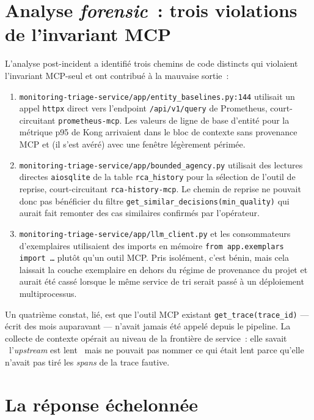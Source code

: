 \documentclass[11pt,a4paper,oneside]{report}
\begin{document}
\section{Analyse \emph{forensic}~: trois violations de l'invariant MCP}

L'analyse post-incident a identifié trois chemins de code distincts
qui violaient l'invariant MCP-seul et ont contribué à la mauvaise
sortie~:

\begin{enumerate}
  \item \texttt{monitoring-triage-service/app/entity\_baselines.py:144}
        utilisait un appel \texttt{httpx} direct vers l'endpoint
        \texttt{/api/v1/query} de Prometheus, court-circuitant
        \texttt{prometheus-mcp}. Les valeurs de ligne de base
        d'entité pour la métrique p95 de Kong arrivaient dans le
        bloc de contexte sans provenance MCP et (il s'est avéré)
        avec une fenêtre légèrement périmée.
  \item \texttt{monitoring-triage-service/app/bounded\_agency.py}
        utilisait des lectures directes \texttt{aiosqlite} de la
        table \texttt{rca\_history} pour la sélection de l'outil
        de reprise, court-circuitant \texttt{rca-history-mcp}. Le
        chemin de reprise ne pouvait donc pas bénéficier du filtre
        \texttt{get\_similar\_decisions(min\_quality)} qui aurait
        fait remonter des cas similaires confirmés par
        l'opérateur.
  \item \texttt{monitoring-triage-service/app/llm\_client.py} et
        les consommateurs d'exemplaires utilisaient des imports en
        mémoire \texttt{from app.exemplars import \ldots} plutôt
        qu'un outil MCP. Pris isolément, c'est bénin, mais cela
        laissait la couche exemplaire en dehors du régime de
        provenance du projet et aurait été cassé lorsque le même
        service de tri serait passé à un déploiement multiprocessus.
\end{enumerate}

Un quatrième constat, lié, est que l'outil MCP existant
\texttt{get\_trace(trace\_id)} --- écrit des mois auparavant ---
n'avait jamais été appelé depuis le pipeline. La collecte de
contexte opérait au niveau de la frontière de service~: elle savait
\og~l'\emph{upstream} est lent~\fg{} mais ne pouvait pas nommer ce
qui était lent parce qu'elle n'avait pas tiré les \emph{spans} de
la trace fautive.

\section{La réponse échelonnée}
\end{document}

